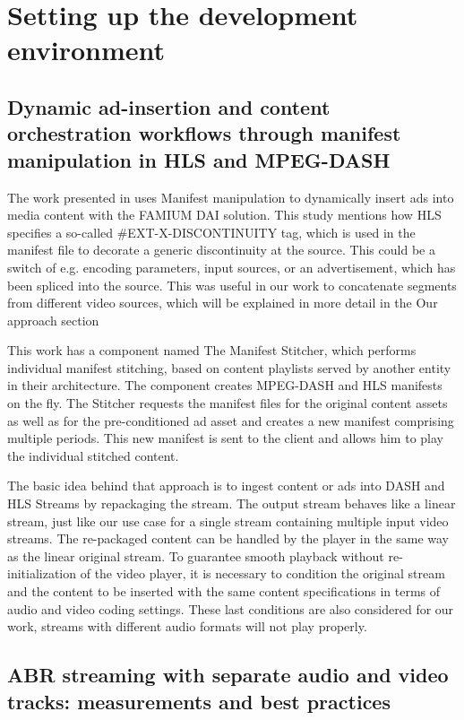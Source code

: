 \section{\textbf{Setting up the development environment }}\label{sec:relatedwork}

\subsection{Dynamic ad-insertion and content orchestration workflows through manifest manipulation in HLS and MPEG-DASH}

The work presented in \cite{adinsertion} uses Manifest manipulation to dynamically insert ads into media content with the FAMIUM DAI solution. This study mentions how HLS specifies a so-called \#EXT-X-DISCONTINUITY tag, which is used in the manifest file to decorate a generic discontinuity at the source. This could be a switch of e.g. encoding parameters, input sources, or an advertisement, which has been spliced into the source. This was useful in our work to concatenate segments from different video sources, which will be explained in more detail in the Our approach section

This work has a component named The Manifest Stitcher, which performs individual manifest stitching, based on content playlists served by another entity in their architecture. The component creates MPEG-DASH and HLS manifests on the fly. The Stitcher requests the manifest files for the original content assets as well as for the pre-conditioned ad asset and creates a new manifest comprising multiple periods. This new manifest is sent to the client and allows him to play the individual stitched content.

The basic idea behind that approach is to ingest content or ads into DASH and HLS Streams by repackaging the stream. The output stream behaves like a linear stream, just like our use case for a single stream containing multiple input video streams. The re-packaged content can be handled by the player in the same way as the linear original stream. To guarantee smooth playback without re-initialization of the video player, it is necessary to condition the original stream and the content to be inserted with the same content specifications in terms of audio and video coding settings. These last conditions are also considered for our work, streams with different audio formats will not play properly.
 
\subsection{ABR streaming with separate audio and video tracks: measurements and best practices}

